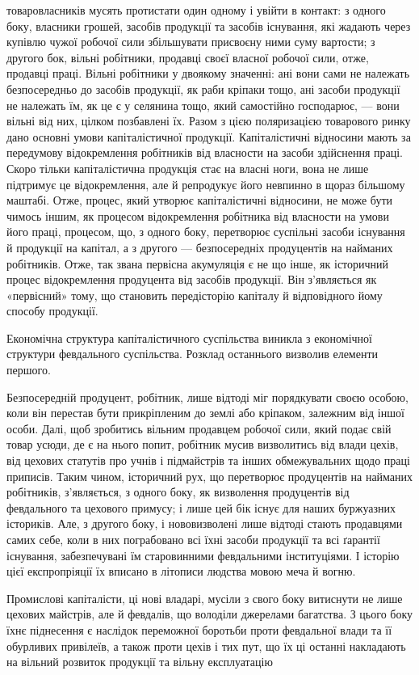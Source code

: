 \parcont{}  %
товаровласників мусять протистати один одному і увійти в контакт:
з одного боку, власники грошей, засобів продукції та засобів
існування, які жадають через купівлю чужої робочої сили
збільшувати присвоєну ними суму вартости; з другого бок,
вільні робітники, продавці своєї власної робочої сили, отже, продавці
праці. Вільні робітники у двоякому значенні: ані вони
сами не належать безпосередньо до засобів продукції, як раби
кріпаки тощо, ані засоби продукції не належать їм, як це є у
селянина тощо, який самостійно господарює, — вони вільні від
них, цілком позбавлені їх. Разом з цією поляризацією товарового
ринку дано основні умови капіталістичної продукції. Капіталістичні
відносини мають за передумову відокремлення робітників
від власности на засоби здійснення праці. Скоро тільки
капіталістична продукція стає на власні ноги, вона не лише
підтримує це відокремлення, але й репродукує його невпинно
в щораз більшому маштабі. Отже, процес, який утворює капіталістичні
відносини, не може бути чимось іншим, як процесом
відокремлення робітника від власности на умови його праці,
процесом, що, з одного боку, перетворює суспільні засоби існування
й продукції на капітал, а з другого — безпосередніх продуцентів
на найманих робітників. Отже, так звана первісна
акумуляція є не що інше, як історичний процес відокремлення
продуцента від засобів продукції. Він з’являється як «первісний»
тому, що становить передісторію капіталу й відповідного
йому способу продукції.

Економічна структура капіталістичного суспільства виникла
з економічної структури февдального суспільства. Розклад
останнього визволив елементи першого.

Безпосередній продуцент, робітник, лише відтоді міг порядкувати
своєю особою, коли він перестав бути прикріпленим до
землі або кріпаком, залежним від іншої особи. Далі, щоб зробитись
вільним продавцем робочої сили, який подає свій товар
усюди, де є на нього попит, робітник мусив визволитись від влади
цехів, від цехових статутів про учнів і підмайстрів та інших
обмежувальних щодо праці приписів. Таким чином, історичний
рух, що перетворює продуцентів на найманих робітників, з’являється,
з одного боку, як визволення продуцентів від февдального
та цехового примусу; і лише цей бік існує для наших буржуазних
істориків. Але, з другого боку, і нововизволені лише
відтоді стають продавцями самих себе, коли в них пограбовано
всі їхні засоби продукції та всі ґарантії існування, забезпечувані
їм старовинними февдальними інституціями. І історію цієї
експропріяції їх вписано в літописи людства мовою меча й вогню.

Промислові капіталісти, ці нові владарі, мусіли з свого боку
витиснути не лише цехових майстрів, але й февдалів, що володіли
джерелами багатства. З цього боку їхнє піднесення є наслідок
переможної боротьби проти февдальної влади та її обурливих
привілеїв, а також проти цехів і тих пут, що їх ці останні накладають
на вільний розвиток продукції та вільну експлуатацію
\parbreak{}  %
